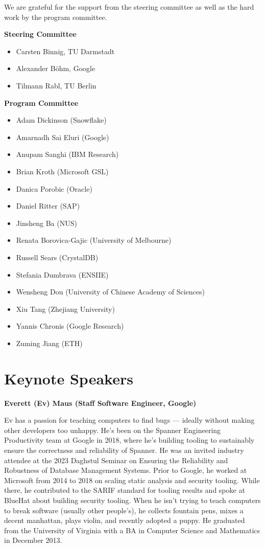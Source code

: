 \documentclass[sigconf]{acmart}
\begin{document}
We are grateful for the support from the steering committee as well as the hard work by the program committee.

\textbf{Steering Committee}
\begin{itemize}
	\item Carsten Binnig, TU Darmstadt
	\item Alexander Böhm, Google
	\item Tilmann Rabl, TU Berlin
\end{itemize}

\noindent{}\textbf{Program Committee}
\begin{itemize}
	\item Adam Dickinson (Snowflake)
	\item Amarnadh Sai Eluri (Google)
	\item Anupam Sanghi (IBM Research)
	\item Brian Kroth (Microsoft GSL)
	\item Danica Porobic (Oracle)
	\item Daniel Ritter (SAP)
	\item Jinsheng Ba (NUS)
	\item Renata Borovica-Gajic (University of Melbourne)
	\item Russell Sears (CrystalDB)
	\item Stefania Dumbrava (ENSIIE)
	\item Wensheng Dou (University of Chinese Academy of Sciences)
	\item Xiu Tang (Zhejiang University)
	\item Yannis Chronis (Google Research)
	\item Zuming Jiang (ETH)
\end{itemize}

\section{Keynote Speakers}
\textbf{Everett (Ev) Maus (Staff Software Engineer, Google)}

Ev has a passion for teaching computers to find bugs --- ideally without making other developers too unhappy.
He's been on the Spanner Engineering Productivity team at Google in 2018, where he’s building tooling to sustainably ensure the correctness and reliability of Spanner. He was an invited industry attendee at the 2023 Daghstul Seminar on Ensuring the Reliability and Robustness of Database Management Systems.
Prior to Google, he worked at Microsoft from 2014 to 2018 on scaling static analysis and security tooling. While there, he contributed to the SARIF standard for tooling results and spoke at BlueHat about building security tooling.
When he isn’t trying to teach computers to break software (usually other people’s), he collects fountain pens, mixes a decent manhattan, plays violin, and recently adopted a puppy.
He graduated from the University of Virginia with a BA in Computer Science and Mathematics in December 2013.
\end{document}
